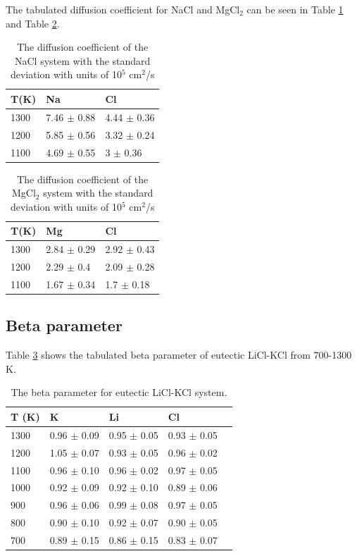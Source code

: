 \documentclass[review]{elsarticle}
\begin{document}
The tabulated diffusion coefficient for NaCl and MgCl$_2$ can be seen in Table \ref{Table: nacl diffusion} and Table \ref{Table: mgcl2 diffusion}.

\begin{table}[h!]
\centering
\caption{The diffusion coefficient of the NaCl system with the standard deviation with units of 10$^5$ cm$^2$/s }
\begin{tabular}{lll}
\hline
T(K) & Na          & Cl                   \\
\hline
1300 & 7.46 $\pm$ 0.88 & 4.44 $\pm$ 0.36\\
1200 & 5.85 $\pm$ 0.56 & 3.32 $\pm$ 0.24  \\
1100 & 4.69 $\pm$ 0.55 & 3 $\pm$ 0.36     \\
\hline
\end{tabular}
\label{Table: nacl diffusion}
\end{table}

\begin{table}[h!]
\centering
\caption{The diffusion coefficient of the MgCl$_2$ system with the standard deviation with units of 10$^5$ cm$^2$/s }
\begin{tabular}{lll}
\hline
T(K) & Mg          & Cl                \\
\hline
1300 & 2.84 $\pm$ 0.29 & 2.92 $\pm$ 0.43  \\
1200 & 2.29 $\pm$ 0.4  & 2.09 $\pm$ 0.28  \\
1100 & 1.67 $\pm$ 0.34 & 1.7 $\pm$ 0.18   \\
\hline
\end{tabular}
\label{Table: mgcl2 diffusion}
\end{table}
\FloatBarrier

\subsection{Beta parameter}
Table \ref{table:licl-kcl-beta} shows the tabulated beta parameter of eutectic LiCl-KCl from 700-1300 K.  
\begin{table}[h!]
\centering
\caption{The beta parameter for eutectic LiCl-KCl system. }
\begin{tabular}{lllll}
\hline
T (K) & K           & Li          & Cl          &  \\
\hline
1300            & 0.96 $\pm$ 0.09 & 0.95 $\pm$ 0.05 & 0.93 $\pm$ 0.05 &  \\
1200            & 1.05 $\pm$ 0.07 & 0.93 $\pm$ 0.05 & 0.96 $\pm$ 0.02 &  \\
1100            & 0.96 $\pm$ 0.10  & 0.96 $\pm$ 0.02 & 0.97 $\pm$ 0.05 &  \\
1000            & 0.92 $\pm$ 0.09 & 0.92 $\pm$ 0.10  & 0.89 $\pm$ 0.06 &  \\
900             & 0.96 $\pm$ 0.06 & 0.99 $\pm$ 0.08 & 0.97 $\pm$ 0.05 &  \\
800             & 0.90 $\pm$ 0.10   & 0.92 $\pm$ 0.07 & 0.90 $\pm$ 0.05  &  \\
700             & 0.89 $\pm$ 0.15 & 0.86 $\pm$ 0.15 & 0.83 $\pm$ 0.07  & \\
\hline
\end{tabular}
\label{table:licl-kcl-beta}
\end{table}
\FloatBarrier
\end{document}
